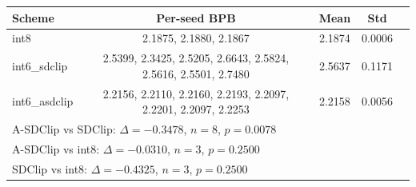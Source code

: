 \begin{tabular}{l c c c c}
\toprule
Scheme & Per-seed BPB & Mean & Std \\
\midrule
int8 & 2.1875, 2.1880, 2.1867 & 2.1874 & 0.0006 \\
int6\_sdclip & 2.5399, 2.3425, 2.5205, 2.6643, 2.5824, 2.5616, 2.5501, 2.7480 & 2.5637 & 0.1171 \\
int6\_asdclip & 2.2156, 2.2110, 2.2160, 2.2193, 2.2097, 2.2201, 2.2097, 2.2253 & 2.2158 & 0.0056 \\
\midrule
\multicolumn{3}{l}{A-SDClip vs SDClip: $\Delta=-0.3478$, $n=8$, $p=0.0078$} \\
\multicolumn{3}{l}{A-SDClip vs int8: $\Delta=-0.0310$, $n=3$, $p=0.2500$} \\
\multicolumn{3}{l}{SDClip vs int8: $\Delta=-0.4325$, $n=3$, $p=0.2500$} \\
\bottomrule
\end{tabular}